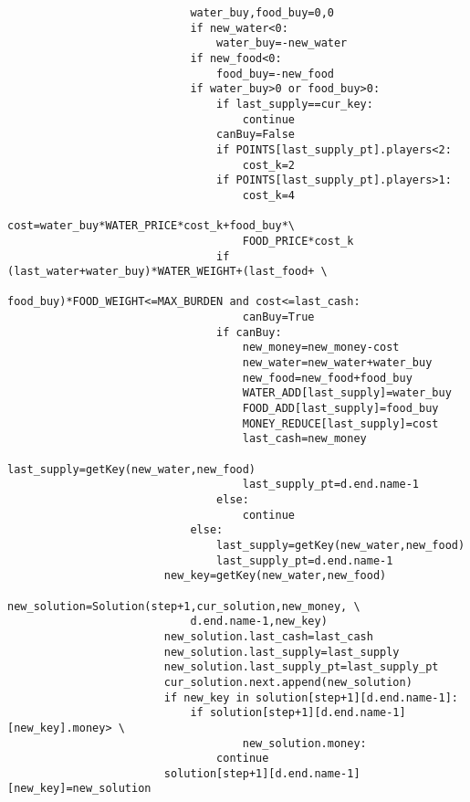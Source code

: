 \documentclass[bwprint]{cumcmthesis} %
\begin{document}
\begin{appendices}
\begin{lstlisting}
                            water_buy,food_buy=0,0
                            if new_water<0:
                                water_buy=-new_water
                            if new_food<0:
                                food_buy=-new_food
                            if water_buy>0 or food_buy>0:
                                if last_supply==cur_key:
                                    continue
                                canBuy=False
                                if POINTS[last_supply_pt].players<2:
                                    cost_k=2
                                if POINTS[last_supply_pt].players>1:
                                    cost_k=4
                                cost=water_buy*WATER_PRICE*cost_k+food_buy*\
                                    FOOD_PRICE*cost_k
                                if (last_water+water_buy)*WATER_WEIGHT+(last_food+ \
                                        food_buy)*FOOD_WEIGHT<=MAX_BURDEN and cost<=last_cash:
                                    canBuy=True
                                if canBuy:
                                    new_money=new_money-cost
                                    new_water=new_water+water_buy
                                    new_food=new_food+food_buy
                                    WATER_ADD[last_supply]=water_buy
                                    FOOD_ADD[last_supply]=food_buy
                                    MONEY_REDUCE[last_supply]=cost
                                    last_cash=new_money
                                    last_supply=getKey(new_water,new_food)
                                    last_supply_pt=d.end.name-1
                                else:
                                    continue
                            else:
                                last_supply=getKey(new_water,new_food)
                                last_supply_pt=d.end.name-1
                        new_key=getKey(new_water,new_food)   
                        new_solution=Solution(step+1,cur_solution,new_money, \
                            d.end.name-1,new_key)
                        new_solution.last_cash=last_cash
                        new_solution.last_supply=last_supply
                        new_solution.last_supply_pt=last_supply_pt
                        cur_solution.next.append(new_solution)
                        if new_key in solution[step+1][d.end.name-1]:
                            if solution[step+1][d.end.name-1][new_key].money> \
                                    new_solution.money:
                                continue
                        solution[step+1][d.end.name-1][new_key]=new_solution

\end{lstlisting}
\end{appendices}
\end{document}
